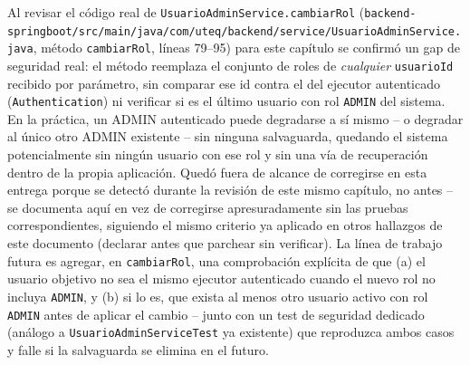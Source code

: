 Al revisar el código real de \texttt{UsuarioAdminService.cambiarRol}
(\texttt{backend-springboot/\allowbreak src/\allowbreak main/\allowbreak java/\allowbreak com/\allowbreak uteq/\allowbreak backend/\allowbreak service/\allowbreak UsuarioAdminService.java},
método \texttt{cambiarRol}, líneas 79--95) para este capítulo se
confirmó un gap de seguridad real: el método reemplaza el conjunto de
roles de \emph{cualquier} \texttt{usuarioId} recibido por parámetro, sin
comparar ese id contra el del ejecutor autenticado
(\texttt{Authentication}) ni verificar si es el último usuario con rol
\texttt{ADMIN} del sistema. En la práctica, un ADMIN autenticado puede
degradarse a sí mismo -- o degradar al único otro ADMIN existente -- sin
ninguna salvaguarda, quedando el sistema potencialmente sin ningún
usuario con ese rol y sin una vía de recuperación dentro de la propia
aplicación. Quedó fuera de alcance de corregirse en esta entrega porque
se detectó durante la revisión de este mismo capítulo, no antes -- se
documenta aquí en vez de corregirse apresuradamente sin las pruebas
correspondientes, siguiendo el mismo criterio ya aplicado en otros
hallazgos de este documento (declarar antes que parchear sin verificar).
La línea de trabajo futura es agregar, en \texttt{cambiarRol}, una
comprobación explícita de que (a) el usuario objetivo no sea el mismo
ejecutor autenticado cuando el nuevo rol no incluya \texttt{ADMIN}, y (b)
si lo es, que exista al menos otro usuario activo con rol \texttt{ADMIN}
antes de aplicar el cambio -- junto con un test de seguridad dedicado
(análogo a \texttt{UsuarioAdminServiceTest} ya existente) que reproduzca
ambos casos y falle si la salvaguarda se elimina en el futuro.

